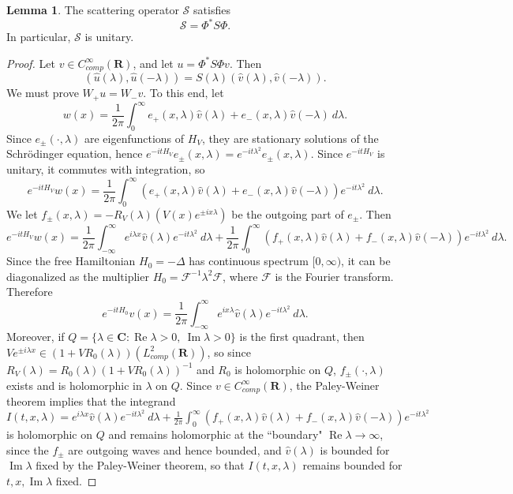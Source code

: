 \documentclass[12pt]{report}
\newcommand{\RR}{\mathbf{R}}
\newcommand{\CC}{\mathbf{C}}
\renewcommand{\Re}{\operatorname{Re}}
\renewcommand{\Im}{\operatorname{Im}}
\theoremstyle{definition}
\newtheorem{lemma}[theorem]{Lemma}
\begin{document}
\begin{lemma}
The scattering operator $\mathcal S$ satisfies
$$\mathcal S = \Phi^*S\Phi.$$
In particular, $\mathcal S$ is unitary.
\end{lemma}
\begin{proof}
Let $v \in C^\infty_{comp}(\RR)$, and let $u = \Phi^*S\Phi v$. Then
$$(\hat u(\lambda), \hat u(-\lambda)) = S(\lambda)(\hat v(\lambda), \hat v(-\lambda)).$$
We must prove $W_+u = W_-v$. To this end, let
$$w(x) = \frac{1}{2\pi} \int_0^\infty e_+(x, \lambda)\hat v(\lambda) + e_-(x, \lambda)\hat v(-\lambda) ~d\lambda.$$
Since $e_\pm(\cdot, \lambda)$ are eigenfunctions of $H_V$, they are stationary solutions of the Schrödinger equation, hence $e^{-itH_V}e_\pm(x, \lambda) = e^{-it\lambda^2}e_\pm(x, \lambda)$. Since $e^{-itH_V}$ is unitary, it commutes with integration, so
$$e^{-itH_V}w(x) = \frac{1}{2\pi} \int_0^\infty (e_+(x, \lambda) \hat v(\lambda) + e_-(x, \lambda) \hat v(-\lambda))e^{-it\lambda^2} ~d\lambda.$$
We let $f_\pm(x, \lambda) = -R_V(\lambda)(V(x)e^{\pm ix\lambda})$ be the outgoing part of $e_\pm$. Then
$$ e^{-itH_V}w(x) = \frac{1}{2\pi} \int_{-\infty}^\infty e^{i\lambda x}\hat v(\lambda) e^{-it\lambda^2} ~d\lambda + \frac{1}{2\pi} \int_0^\infty (f_+(x, \lambda) \hat v(\lambda) + f_-(x, \lambda) \hat v(-\lambda))e^{-it\lambda^2} ~d\lambda.$$
Since the free Hamiltonian $H_0 = -\Delta$ has continuous spectrum $[0, \infty)$, it can be diagonalized as the multiplier $H_0 = \mathcal F^{-1} \lambda^2 \mathcal F$, where $\mathcal F$ is the Fourier transform. Therefore
$$e^{-itH_0}v(x) = \frac{1}{2\pi} \int_{-\infty}^\infty e^{ix\lambda} \hat v(\lambda) e^{-it\lambda^2} ~d\lambda.$$
Moreover, if $Q = \{\lambda \in \CC: \Re \lambda > 0, ~\Im \lambda > 0\}$ is the first quadrant, then $Ve^{\pm i\lambda x} \in (1 + VR_0(\lambda))(L^2_{comp}(\RR))$, so since $R_V(\lambda) = R_0(\lambda)(1 + VR_0(\lambda))^{-1}$ and $R_0$ is holomorphic on $Q$, $f_\pm(\cdot, \lambda)$ exists and is holomorphic in $\lambda$ on $Q$. Since $v \in C_{comp}^\infty(\RR)$, the Paley-Weiner theorem implies that the integrand $I(t, x, \lambda) = e^{i\lambda x}\hat v(\lambda) e^{-it\lambda^2} ~d\lambda + \frac{1}{2\pi} \int_0^\infty (f_+(x, \lambda) \hat v(\lambda) + f_-(x, \lambda) \hat v(-\lambda))e^{-it\lambda^2}$ is holomorphic on $Q$ and remains holomorphic at the ``boundary" $\Re \lambda \to \infty$, since the $f_\pm$ are outgoing waves and hence bounded, and $\hat v(\lambda)$ is bounded for $\Im \lambda$ fixed by the Paley-Weiner theorem, so that $I(t, x, \lambda)$ remains bounded for $t,x,\Im \lambda$ fixed.


\end{proof}
\end{document}
